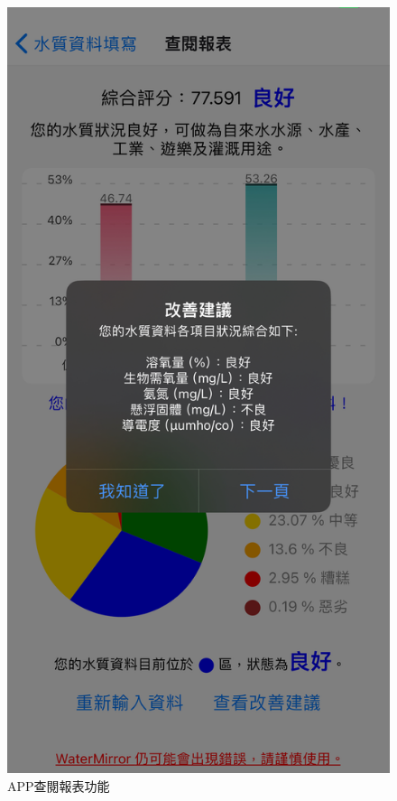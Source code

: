 \documentclass[12pt,a4paper]{article}
\begin{document}
\begin{enumerate}
\begin{enumerate}[label=\arabic*.]
\begin{enumerate}[label=3-2-\arabic*.]
\begin{figure}[H]
\begin{minipage}{0.3\textwidth}
                    \caption{APP查閱報表功能}
                \end{minipage}%
                \hfill
                \begin{minipage}{0.3\textwidth}
                    \centering
                    \includegraphics[width=\textwidth]{resources/image/front-end/APP報表詳細.png}

\end{minipage}
\end{figure}
\end{enumerate}
\end{enumerate}
\end{enumerate}
\end{document}

